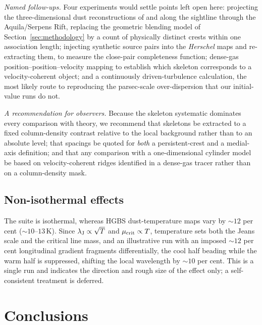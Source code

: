 \documentclass[usenatbib,twoside,twocolumn]{mnras}
\begin{document}
\smallskip\noindent\emph{Named follow-ups.} Four experiments would settle points left open here: projecting the three-dimensional dust reconstructions of \citet{Zucker2020} and \citet{Green2024} along the sightline through the Aquila/Serpens Rift, replacing the geometric blending model of Section~\ref{sec:methodology} by a count of physically distinct crests within one association length; injecting synthetic source pairs into the \textit{Herschel} maps and re-extracting them, to measure the close-pair completeness function; dense-gas position--position--velocity mapping to establish which skeleton corresponds to a velocity-coherent object; and a continuously driven-turbulence calculation, the most likely route to reproducing the parsec-scale over-dispersion that our initial-value runs do not.

\smallskip\noindent\emph{A recommendation for observers.} Because the skeleton systematic dominates every comparison with theory, we recommend that skeletons be extracted to a fixed column-density contrast relative to the local background rather than to an absolute level; that spacings be quoted for \emph{both} a persistent-crest and a medial-axis definition; and that any comparison with a one-dimensional cylinder model be based on velocity-coherent ridges identified in a dense-gas tracer rather than on a column-density mask.



\subsection{Non-isothermal effects}
\label{sec:mt_variation}

The suite is isothermal, whereas HGBS dust-temperature maps vary by $\sim12$ per cent ($\sim10$--$13$\,K). Since $\lambda_{\rm J}\propto\sqrt{T}$ and $\mu_{\rm crit}\propto T$, temperature sets both the Jeans scale and the critical line mass, and an illustrative run with an imposed $\sim12$ per cent longitudinal gradient fragments differentially, the cool half beading while the warm half is suppressed, shifting the local wavelength by $\sim10$ per cent. This is a single run and indicates the direction and rough size of the effect only; a self-consistent treatment is deferred.



\section{Conclusions}
\end{document}
